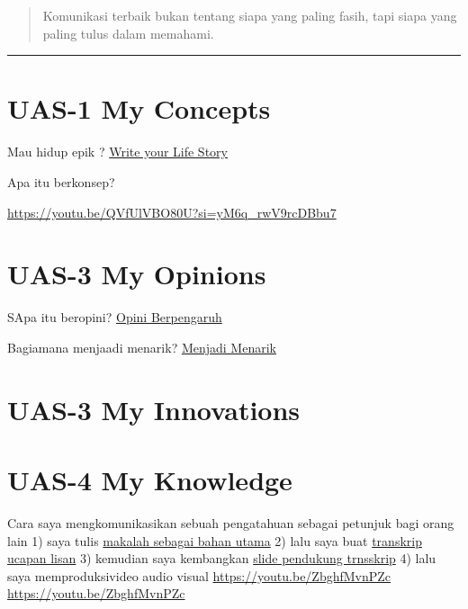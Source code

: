\documentclass[
  letterpaper,
  DIV=11,
  numbers=noendperiod]{scrreprt}
\begin{document}
\begin{quote}
Komunikasi terbaik bukan tentang siapa yang paling fasih, tapi siapa
yang paling tulus dalam memahami.
\end{quote}

\begin{center}\rule{0.5\linewidth}{0.5pt}\end{center}


\chapter{UAS-1 My Concepts}\label{uas-1-my-concepts}

Mau hidup epik ? \href{lifestory.pdf}{Write your Life Story}

Apa itu berkonsep?

\url{https://youtu.be/QVfUlVBO80U?si=yM6q_rwV9rcDBbu7}


\chapter{UAS-3 My Opinions}\label{uas-3-my-opinions}

SApa itu beropini? \href{BM\%20Opini.mp4}{Opini Berpengaruh}

Bagiamana menjaadi menarik? \href{./Interesting.mp4}{Menjadi Menarik}


\chapter{UAS-3 My Innovations}\label{uas-3-my-innovations}


\chapter{UAS-4 My Knowledge}\label{uas-4-my-knowledge}

Cara saya mengkomunikasikan sebuah pengatahuan sebagai petunjuk bagi
orang lain 1) saya tulis
\href{Rekomendasi\%20Presentasi\%20Efektif(Contoh\%20Makalah).pdf}{makalah
sebagai bahan utama} 2) lalu saya buat
\href{Contoh\%20Transkrip\%20Presentasi.pdf}{transkrip ucapan lisan} 3)
kemudian saya kembangkan
\href{Rekomendasi\%20Presentasi\%20(Contoh\%20Slides).pdf}{slide
pendukung trnsskrip} 4) lalu saya memproduksivideo audio visual
\url{https://youtu.be/ZbghfMvnPZc} \url{https://youtu.be/ZbghfMvnPZc}
\end{document}
